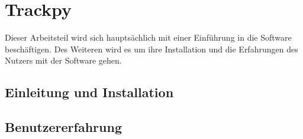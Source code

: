 \chapter{Trackpy}

Dieser Arbeitsteil  wird sich hauptsächlich mit einer Einführung in die Software beschäftigen. Des Weiteren wird es um ihre Installation und die Erfahrungen des Nutzers mit der Software gehen.

\section{Einleitung und Installation}


\section{Benutzererfahrung}

